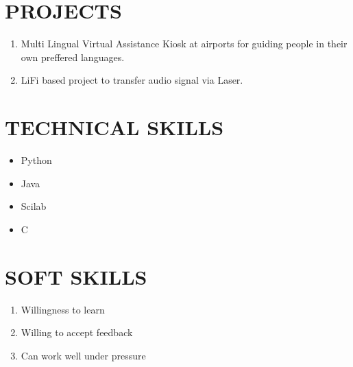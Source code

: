 \documentclass{article}
\begin{document}
\section{PROJECTS}
\begin{enumerate}
               
                \item Multi Lingual Virtual Assistance Kiosk at airports for guiding people in their own preffered languages.
                \item LiFi based project to transfer audio signal via Laser.
\end{enumerate}  
 

\section{TECHNICAL SKILLS}
\begin{itemize}
                \item Python
                \item Java
                \item Scilab
                \item C
\end{itemize}
\section{SOFT SKILLS}
\begin{enumerate}
                \item Willingness to learn
                \item Willing to accept feedback
                \item Can work well under pressure
                
\end{enumerate}           
\end{document}
